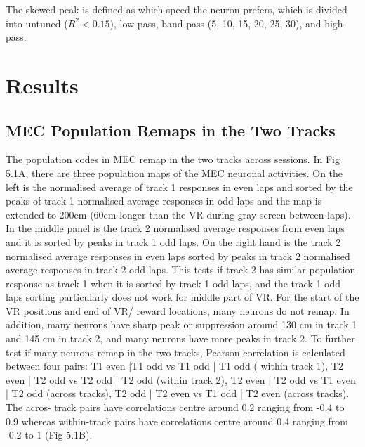 The skewed peak is defined as which speed the neuron prefers, which is divided into untuned (\(R^2 < 0.15\)), low-pass, band-pass (5, 10, 15, 20, 25, 30), and high-pass.



\section{Results}
\subsection{MEC Population Remaps in the Two Tracks}
The population codes in MEC remap in the two tracks across sessions. In Fig 5.1A, there are three population maps of the MEC neuronal activities. On the left is the normalised average of track 1 responses in even laps and sorted by the peaks of track 1 normalised average responses in odd laps and the map is extended to 200cm (60cm longer than the VR during gray screen between laps). In the middle panel is the track 2 normalised average responses from even laps and it is sorted by peaks in track 1 odd laps. On the right hand is the track 2 normalised average responses in even laps sorted by peaks in track 2 normalised average responses in track 2 odd laps. This tests if track 2 has similar population response as track 1 when it is sorted by track 1 odd laps, and the track 1 odd laps sorting particularly does not work for middle part of VR. For the start of the VR positions and end of VR/ reward locations, many neurons do not remap. In addition, many neurons have sharp peak or suppression around 130 cm in track 1 and 145 cm in track 2, and many neurons have more peaks in track 2. To further test if many neurons remap in the two tracks, Pearson correlation is calculated between four pairs: T1 even |T1 odd vs T1 odd | T1 odd ( within track 1), T2 even | T2 odd vs T2 odd | T2 odd (within track 2), T2 even | T2 odd vs T1 even | T2 odd (across tracks), T2 odd | T2 even vs T1 odd | T2 even (across tracks). The acros- track pairs have correlations centre around 0.2 ranging from -0.4 to 0.9 whereas within-track pairs have correlations centre around 0.4 ranging from -0.2 to 1 (Fig 5.1B).

